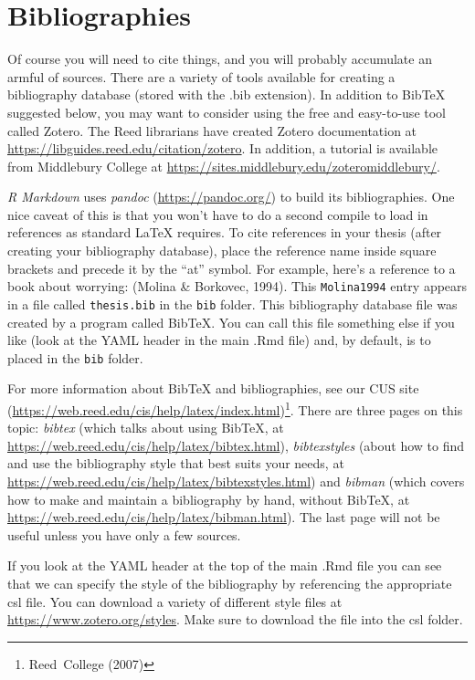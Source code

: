 \documentclass[12pt,twoside]{reedthesis}
\begin{document}
\hypertarget{bibliographies}{%
\section{Bibliographies}\label{bibliographies}}

Of course you will need to cite things, and you will probably accumulate an armful of sources. There are a variety of tools available for creating a bibliography database (stored with the .bib extension). In addition to BibTeX suggested below, you may want to consider using the free and easy-to-use tool called Zotero. The Reed librarians have created Zotero documentation at \url{https://libguides.reed.edu/citation/zotero}. In addition, a tutorial is available from Middlebury College at \url{https://sites.middlebury.edu/zoteromiddlebury/}.

\emph{R Markdown} uses \emph{pandoc} (\url{https://pandoc.org/}) to build its bibliographies. One nice caveat of this is that you won't have to do a second compile to load in references as standard LaTeX requires. To cite references in your thesis (after creating your bibliography database), place the reference name inside square brackets and precede it by the ``at'' symbol. For example, here's a reference to a book about worrying: (Molina \& Borkovec, 1994). This \texttt{Molina1994} entry appears in a file called \texttt{thesis.bib} in the \texttt{bib} folder. This bibliography database file was created by a program called BibTeX. You can call this file something else if you like (look at the YAML header in the main .Rmd file) and, by default, is to placed in the \texttt{bib} folder.

For more information about BibTeX and bibliographies, see our CUS site (\url{https://web.reed.edu/cis/help/latex/index.html})\footnote{Reed~College (2007)}. There are three pages on this topic: \emph{bibtex} (which talks about using BibTeX, at \url{https://web.reed.edu/cis/help/latex/bibtex.html}), \emph{bibtexstyles} (about how to find and use the bibliography style that best suits your needs, at \url{https://web.reed.edu/cis/help/latex/bibtexstyles.html}) and \emph{bibman} (which covers how to make and maintain a bibliography by hand, without BibTeX, at \url{https://web.reed.edu/cis/help/latex/bibman.html}). The last page will not be useful unless you have only a few sources.

If you look at the YAML header at the top of the main .Rmd file you can see that we can specify the style of the bibliography by referencing the appropriate csl file. You can download a variety of different style files at \url{https://www.zotero.org/styles}. Make sure to download the file into the csl folder.
\end{document}
